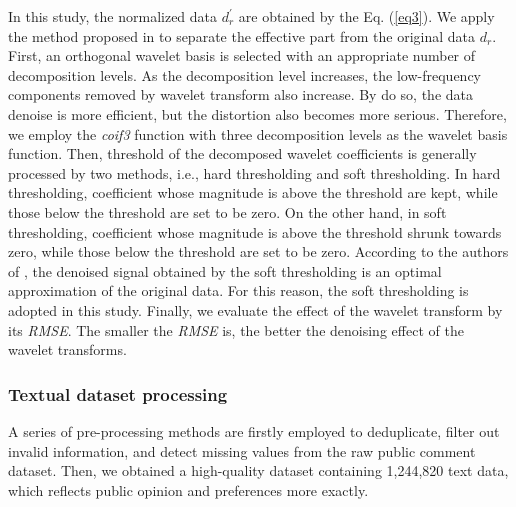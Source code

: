 \documentclass[sn-mathphys]{sn-jnl}%
\theoremstyle{thmstyleone}%
\theoremstyle{thmstyletwo}%
\theoremstyle{thmstylethree}%
\begin{document}
In this study, the normalized data $d^{\prime}_r$ are obtained by the Eq. (\ref{eq3}). We apply the method proposed in \cite{RN190} to separate the effective part from the original data $d_r$. First, an orthogonal wavelet basis is selected with an appropriate number of decomposition levels. As the decomposition level increases, the low-frequency components removed by wavelet transform also increase. By do so, the data denoise is more efficient, but the distortion also becomes more serious. Therefore, we employ the \emph{coif3} function with three decomposition levels as the wavelet basis function. Then, threshold of the decomposed wavelet coefficients is generally processed by two methods, i.e., hard thresholding and soft thresholding. In hard thresholding, coefficient whose magnitude is above the threshold are kept, while those below the threshold are set to be zero. On the other hand, in soft thresholding, coefficient whose magnitude is above the threshold shrunk towards zero, while those below the threshold are set to be zero. According to the authors of \cite{RN189}, the denoised signal obtained by the soft thresholding is an optimal approximation of the original data. For this reason, the soft thresholding is adopted in this study. Finally, we evaluate the effect of the wavelet transform by its \emph{RMSE}. The smaller the \emph{RMSE} is, the better the denoising effect of the wavelet transforms.

\subsubsection{Textual dataset processing}\label{Textual dataset processing}
A series of pre-processing methods are firstly employed to deduplicate, filter out invalid information, and detect missing values from the raw public comment dataset. Then, we obtained a high-quality dataset containing 1,244,820 text data, which reflects public opinion and preferences more exactly.
\end{document}
